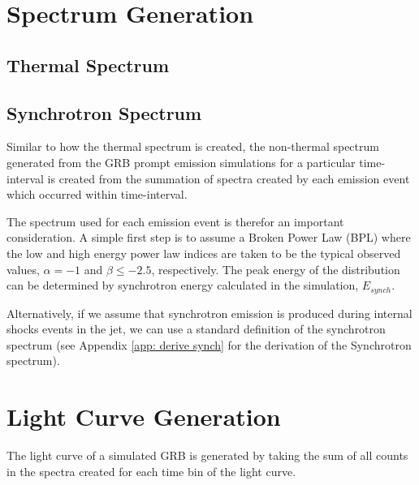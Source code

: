 \documentclass[linenumbers,twocolumn]{aastex631}
\begin{document}
\section{Spectrum Generation} \label{sec:spectrum}
\subsection{Thermal Spectrum}

\subsection{Synchrotron Spectrum}

Similar to how the thermal spectrum is created, the non-thermal spectrum generated from the GRB prompt emission simulations for a particular time-interval is created from the summation of spectra created by each emission event which occurred within time-interval.

The spectrum used for each emission event is therefor an important consideration. A simple first step is to assume a Broken Power Law (BPL) where the low and high energy power law indices are taken to be the typical observed values, $\alpha=-1$ and $\beta\leq-2.5$, respectively. The peak energy of the distribution can be determined by synchrotron energy calculated in the simulation, $E_{synch}$.

Alternatively, if we assume that synchrotron emission is produced during internal shocks events in the jet, we can use a standard definition of the synchrotron spectrum \citep{1998ApJ...497L..17S} (see Appendix \ref{app: derive synch} for the derivation of the Synchrotron spectrum).


\section{Light Curve Generation} \label{sec:light curve}

The light curve of a simulated GRB is generated by taking the sum of all counts in the spectra created for each time bin of the light curve. 



\end{document}
